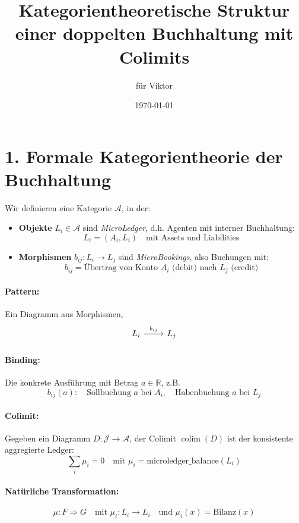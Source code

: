 \documentclass{article}
\title{Kategorientheoretische Struktur einer doppelten Buchhaltung mit Colimits}
\author{für Viktor}
\date{\today}
\begin{document}
\maketitle

\section*{1. Formale Kategorientheorie der Buchhaltung}

Wir definieren eine Kategorie \( \mathcal{A} \), in der:

\begin{itemize}
  \item \textbf{Objekte} \( L_i \in \mathcal{A} \) sind \emph{MicroLedger}, d.h. Agenten mit interner Buchhaltung:
  \[
  L_i = (A_i, L_i) \quad \text{mit Assets und Liabilities}
  \]
  \item \textbf{Morphismen} \( b_{ij} : L_i \to L_j \) sind \emph{MicroBookings}, also Buchungen mit:
  \[
  b_{ij} = \text{Übertrag von Konto } A_i \text{ (debit) nach } L_j \text{ (credit)}
  \]
\end{itemize}

\paragraph{Pattern:} Ein Diagramm aus Morphismen,
\[
\begin{tikzcd}
L_i \arrow[r, "b_{ij}"] & L_j
\end{tikzcd}
\]

\paragraph{Binding:} Die konkrete Ausführung mit Betrag \( a \in \mathbb{R} \), z.B.
\[
b_{ij}(a): \quad \text{Sollbuchung } a \text{ bei } A_i, \quad \text{Habenbuchung } a \text{ bei } L_j
\]

\paragraph{Colimit:} Gegeben ein Diagramm \( D: \mathcal{J} \to \mathcal{A} \), der Colimit \( \operatorname{colim}(D) \) ist der konsistente aggregierte Ledger:
\[
\sum_i \mu_i = 0 \quad \text{mit } \mu_i = \text{microledger\_balance}(L_i)
\]

\paragraph{Natürliche Transformation:}
\[
\mu : F \Rightarrow G \quad \text{mit } \mu_i: L_i \to L_i \quad \text{und } \mu_i(x) = \text{Bilanz}(x)
\]
\end{document}
